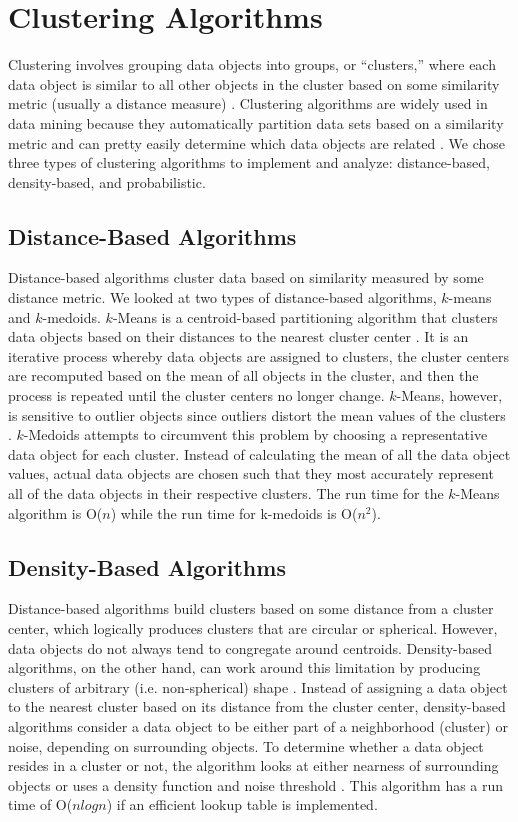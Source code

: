\documentclass[11pt,letterpaper]{article}
\begin{document}
\section{Clustering Algorithms}
Clustering involves grouping data objects into groups, or ``clusters,'' where each data object is similar to all other objects in the cluster based on some similarity metric (usually a distance measure) \cite{Han}.  Clustering algorithms are widely used in data mining because they automatically partition data sets based on a similarity metric and can pretty easily determine which data objects are related \cite{Han}.  We chose three types of clustering algorithms to implement and analyze:  distance-based, density-based, and probabilistic.

\subsection{Distance-Based Algorithms}
Distance-based algorithms cluster data based on similarity measured by some distance metric.  We looked at two types of distance-based algorithms, $k$-means and $k$-medoids.  $k$-Means is a centroid-based partitioning algorithm that clusters data objects based on their distances to the nearest cluster center \cite{Han}.  It is an iterative process whereby data objects are assigned to clusters, the cluster centers are recomputed based on the mean of all objects in the cluster, and then the process is repeated until the cluster centers no longer change.  $k$-Means, however, is sensitive to outlier objects since outliers distort the mean values of the clusters \cite{Han}.  $k$-Medoids attempts to circumvent this problem by choosing a representative data object for each cluster.  Instead of calculating the mean of all the data object values, actual data objects are chosen such that they most accurately represent all of the data objects in their respective clusters.  The run time for the $k$-Means algorithm is O($n$)\cite{Lloyd} while the run time for k-medoids is O($n^{2}$)\cite{Kaufman}.

\subsection{Density-Based Algorithms}
Distance-based algorithms build clusters based on some distance from a cluster center, which logically produces clusters that are circular or spherical.  However, data objects do not always tend to congregate around centroids.  Density-based algorithms, on the other hand, can work around this limitation by producing clusters of arbitrary (i.e. non-spherical) shape \cite{Han}.  Instead of assigning a data object to the nearest cluster based on its distance from the cluster center, density-based algorithms consider a data object to be either part of a neighborhood (cluster) or noise, depending on surrounding objects.  To determine whether a data object resides in a cluster or not, the algorithm looks at either nearness of surrounding objects or uses a density function and noise threshold \cite{Han}.  This algorithm has a run time of O($n log n$) if an efficient lookup table is implemented\cite{Ester96}.
\end{document}
